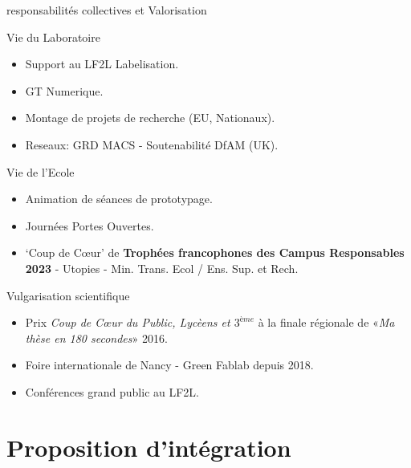 \documentclass[
  11pt,
  ignorenonframetext,
  aspectratio=169,
  c]{beamer}
\providecommand{\tightlist}{%
  \setlength{\itemsep}{0pt}\setlength{\parskip}{0pt}}\usepackage{longtable,booktabs,array}
\begin{document}
\begin{frame}{responsabilités collectives et Valorisation}
\begin{block}{Vie du Laboratoire}
\protect\hypertarget{vie-du-laboratoire}{}
\scriptsize

\begin{itemize}
\tightlist
\item
  Support au LF2L \textbar{} Labelisation.
\item
  GT Numerique.
\item
  Montage de projets de recherche (EU, Nationaux).
\item
  Reseaux: GRD MACS - Soutenabilité \textbar{} DfAM (UK).
\end{itemize}
\end{block}

\begin{block}{Vie de l'Ecole}
\protect\hypertarget{vie-de-lecole}{}
\scriptsize

\begin{itemize}
\tightlist
\item
  Animation de séances de prototypage.
\item
  Journées Portes Ouvertes.
\item
  `Coup de Cœur' de \textbf{Trophées francophones des Campus
  Responsables 2023} - Utopies - Min. Trans. Ecol / Ens. Sup. et Rech.
\end{itemize}
\end{block}

\begin{block}{Vulgarisation scientifique}
\protect\hypertarget{vulgarisation-scientifique}{}
\scriptsize

\begin{itemize}
\tightlist
\item
  Prix \emph{Coup de Cœur du Public, Lycèens et \(3^{ème}\)} à la finale
  régionale de «\emph{Ma thèse en 180 secondes}» 2016.
\item
  Foire internationale de Nancy - Green Fablab depuis 2018.
\item
  Conférences grand public au LF2L.
\end{itemize}
\end{block}
\end{frame}

\hypertarget{proposition-dintuxe9gration}{%
\section{Proposition d'intégration}\label{proposition-dintuxe9gration}}
\end{document}

